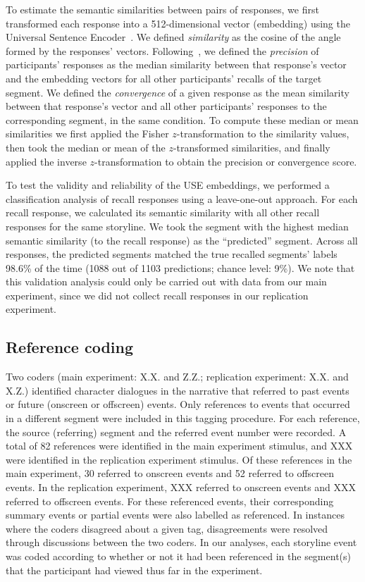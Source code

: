 \documentclass[10pt]{article}
\begin{document}
To estimate the semantic similarities between pairs of responses, we first transformed each response into a 512-dimensional vector (embedding) using the Universal Sentence Encoder~\citep[Transformer USE, ][]{CerEtal18}. We defined \textit{similarity} as the cosine of the angle formed by the responses' vectors. Following~\cite{HeusEtal21}, we defined the \textit{precision} of participants' responses as the median similarity between that response's vector and the embedding vectors for all other participants' recalls of the target segment. We defined the \textit{convergence} of a given response as the mean similarity between that response's vector and all other participants' responses to the corresponding segment, in the same condition. To compute these median or mean similarities we first applied the Fisher $z$-transformation to the similarity values, then took the median or mean of the $z$-transformed similarities, and finally applied the inverse $z$-transformation to obtain the precision or convergence score.

To test the validity and reliability of the USE embeddings, we performed a classification analysis of recall responses using a leave-one-out approach. For each recall response, we calculated its semantic similarity with all other recall responses for the same storyline. We took the segment with the highest median semantic similarity (to the recall response) as the ``predicted'' segment. Across all responses, the predicted segments matched the true recalled segments' labels 98.6\% of the time (1088 out of 1103 predictions; chance level: 9\%). We note that this validation analysis could only be carried out with data from our main experiment, since we did not collect recall responses in our replication experiment.

\subsection*{Reference coding}

Two coders (main experiment: X.X. and Z.Z.; replication experiment: X.X. and X.Z.) identified character dialogues in the narrative that referred to past events or future (onscreen or offscreen) events. Only references to events that occurred in a different segment were included in this tagging procedure. For each reference, the source (referring) segment and the referred event number were recorded. A total of 82 references were identified in the main experiment stimulus, and XXX were identified in the replication experiment stimulus. Of these references in the main experiment, 30 referred to onscreen events and 52 referred to offscreen events. In the replication experiment, XXX referred to onscreen events and XXX referred to offscreen events. For these referenced events, their corresponding summary events or partial events were also labelled as referenced. In instances where the coders disagreed about a given tag, disagreements were resolved through discussions between the two coders. In our analyses, each storyline event was coded according to whether or not it had been referenced in the segment(s) that the participant had viewed thus far in the experiment.
\end{document}
